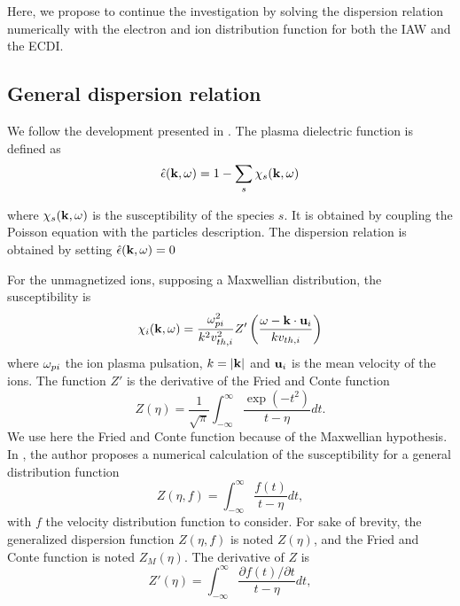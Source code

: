   Here, we propose to continue the investigation by solving the dispersion relation numerically with the electron and ion distribution function for both the \ac{IAW} and the \ac{ECDI}.
  
  
  \subsection{General dispersion relation}
  \label{sec-geneDR}
  
  We follow the development presented in \citet{ducrocq2006,cavalier2013,lafleur2016}.
  The plasma dielectric function is defined as
  \begin{equation} \label{eq-de}
    \hat\epsilon({\mathbf k},\omega) = 1 - \sum_s \chi_s({\mathbf k},\omega)
  \end{equation}
  
  where $\chi_s({\mathbf k}, \omega)$ is the susceptibility of the species $s$.
  It is obtained by coupling the Poisson equation with the particles description.
  The dispersion relation is obtained by setting $  \hat\epsilon({\mathbf k},\omega) =0$
  
  
  For the unmagnetized ions, supposing a Maxwellian distribution, the susceptibility is
  \begin{equation} \label{eq-}
    \chi_i({\mathbf k},\omega) = \frac{\omega_{pi}^2}{k^2 v^2_{th, i}} Z'\left( \frac{\omega - {\mathbf k} \cdot {\mathbf u_{i}}}{k v_{th, i}}  \right)
  \end{equation}
  where $\omega_{pi}$ the ion plasma pulsation, $k=\lvert{\mathbf k}\rvert$ and ${\mathbf u_i}$ is the mean velocity of the ions.
  The function $Z'$ is the derivative of the Fried and Conte function \citep{fried1961}
  \begin{equation} \label{eq-friedandConte}
    Z(\eta) = \frac{1}{\sqrt{\pi}} \int_{-\infty}^{\infty} \frac{\exp{(-t^2)}}{t - \eta} dt.
  \end{equation}
  We use here the Fried and Conte function because of the Maxwellian hypothesis.
  In \citet{xiehua-sheng2013}, the author proposes a numerical calculation of the susceptibility for a general distribution function
  \begin{equation} \label{eq-general}
    Z(\eta, f) = \int_{-\infty}^{\infty} \frac{f(t)}{t - \eta} dt,
  \end{equation}
  with $f$ the velocity distribution function to consider.
  For sake of brevity, the generalized dispersion function $Z(\eta,f)$ is noted $Z(\eta)$, and the Fried and Conte function is noted $Z_M(\eta)$.
  The derivative of $Z$ is
  \begin{equation} \label{eq-derivatives}
    Z'(\eta) = \int_{-\infty}^{\infty} \frac{\partial f(t) / \partial t}{t - \eta} dt,
  \end{equation}
  
